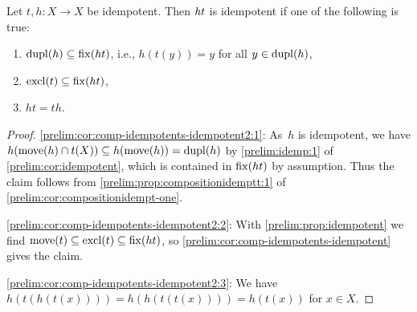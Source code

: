 \begin{corollary} \label{prelim:cor:comp-idempotents-idempotent2}
	Let $t, h \colon X \to X$ be idempotent.
	Then $\concat{t}{h}$ is idempotent if one of the following is true:
	\begin{enumerate}
		\item \label{prelim:cor:comp-idempotents-idempotent2:1}
		$\dupl{h} \subseteq \fix{\concat{t}{h}}$, i.e., $h(t(y)) = y$ for all $y \in \dupl{h}$,
		
		\item \label{prelim:cor:comp-idempotents-idempotent2:2}
		$\excl{t} \subseteq \fix{\concat{t}{h}}$,
		
		\item \label{prelim:cor:comp-idempotents-idempotent2:3} $ht = th$.
	\end{enumerate}
\end{corollary}
\begin{proof}
	\ref{prelim:cor:comp-idempotents-idempotent2:1}: As~$h$ is idempotent, we
	have $h(\move{h} \cap t(X)) \subseteq h(\move{h}) = \dupl{h}$ by
	\cref{prelim:idemp:1} of \cref{prelim:cor:idempotent}, which is contained in
	$\fix{\concat{t}{h}}$ by assumption.
	Thus the claim follows from \cref{prelim:prop:compositionidemptt:1} of
	\cref{prelim:cor:compositionidempt-one}.
	
	\ref{prelim:cor:comp-idempotents-idempotent2:2}: With
	\cref{prelim:prop:idempotent} we find
	$\move{t} \subseteq \excl{t} \subseteq \fix{\concat{t}{h}}$, so
	\cref{prelim:cor:comp-idempotents-idempotent} gives the claim.
	
	\ref{prelim:cor:comp-idempotents-idempotent2:3}: We have
	$h(t(h(t(x)))) = h(h(t(t(x)))) = h(t(x))$ for $x \in X$.
\end{proof}

